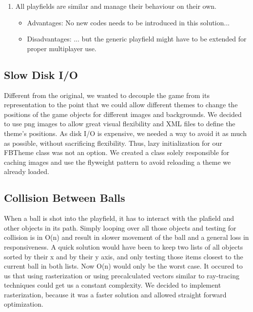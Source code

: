 \begin{description}
\begin{enumerate}
      \item All playfields are similar and manage their behaviour on their own.
      \begin{itemize}
        \item Advantages: No new codes needs to be introduced in this solution...
        \item Disadvantages: ... but the generic playfield might have to be extended for proper multiplayer use.
      \end{itemize}
    \end{enumerate}
%
\end{description}
%
\subsection{Slow Disk I/O}
%
Different from the original, we wanted to decouple the game from its representation 
to the point that we could allow different themes to change the positions of the 
game objects for different images and backgrounds. We decided to use png images to allow 
great visual flexibility and XML files to define the theme's positions. As disk I/O
is expensive, we needed a way to avoid it as much as possible, without sacrificing 
flexibility. Thus, lazy initialization for our FBTheme class was not an option. 
We created a class solely responsible for caching images and use the flyweight 
pattern to avoid reloading a theme we already loaded.
%
\subsection{Collision Between Balls}
\label{sec:collision}
When a ball is shot into the playfield, it has to interact with the plafield 
and other objects in its path. Simply looping over all those objects and 
testing for collision is in O(n) and result in slower 
movement of the ball and a general loss in responsiveness. A quick solution 
would have been to keep two lists of all objects sorted by their x and by their 
y axis, and only testing those items closest to the current ball in both lists.
Now O(n) would only be the worst case. 
It occured to us that using rasterization or using precalculated vectors similar 
to ray-tracing techniques could get us a constant complexity. We decided 
to implement rasterization, because it was a faster solution and allowed straight 
forward optimization.
%
